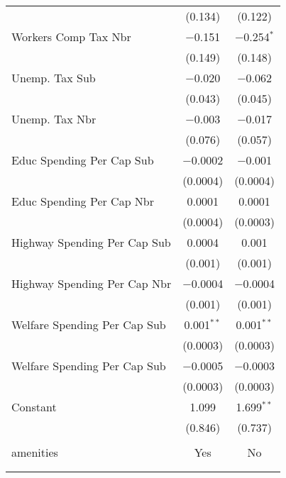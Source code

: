 \begin{table}[!htbp]
\begin{tabular}{@{\extracolsep{5pt}}lcc}
  & (0.134) & (0.122) \\ 
  Workers Comp Tax Nbr & $-$0.151 & $-$0.254$^{*}$ \\ 
  & (0.149) & (0.148) \\ 
  Unemp. Tax Sub & $-$0.020 & $-$0.062 \\ 
  & (0.043) & (0.045) \\ 
  Unemp. Tax Nbr & $-$0.003 & $-$0.017 \\ 
  & (0.076) & (0.057) \\ 
  Educ Spending Per Cap Sub & $-$0.0002 & $-$0.001 \\ 
  & (0.0004) & (0.0004) \\ 
  Educ Spending Per Cap Nbr & 0.0001 & 0.0001 \\ 
  & (0.0004) & (0.0003) \\ 
  Highway Spending Per Cap Sub & 0.0004 & 0.001 \\ 
  & (0.001) & (0.001) \\ 
  Highway Spending Per Cap Nbr & $-$0.0004 & $-$0.0004 \\ 
  & (0.001) & (0.001) \\ 
  Welfare Spending Per Cap Sub & 0.001$^{**}$ & 0.001$^{**}$ \\ 
  & (0.0003) & (0.0003) \\ 
  Welfare Spending Per Cap Sub & $-$0.0005 & $-$0.0003 \\ 
  & (0.0003) & (0.0003) \\ 
  Constant & 1.099 & 1.699$^{**}$ \\ 
  & (0.846) & (0.737) \\ 
 \hline \\[-1.8ex] 
amenities & Yes & No \\ 
\hline \\[-1.8ex] 
\hline 
\hline \\[-1.8ex] 
\end{tabular} 
\end{table} 
